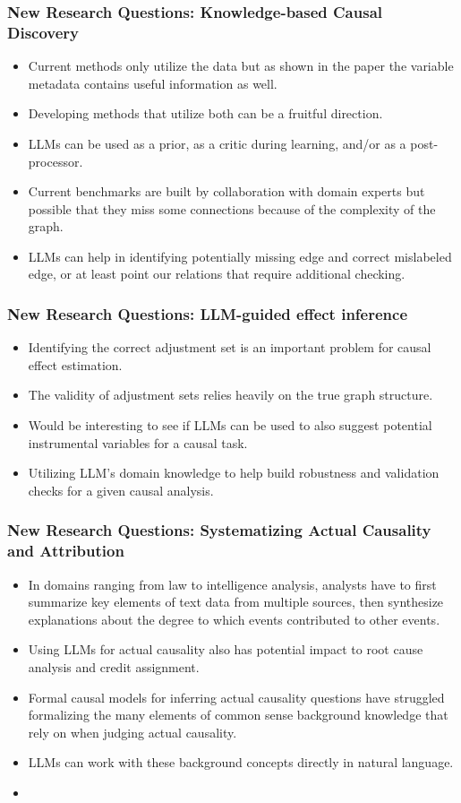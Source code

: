 \documentclass{beamer}
\begin{document}
\begin{frame}
	\frametitle{New Research Questions: Knowledge-based Causal Discovery}
	\begin{itemize}
		\item Current methods only utilize the data but as shown in the
			paper the variable metadata contains useful information
			as well.
		\item Developing methods that utilize both can be a fruitful direction.
		\item LLMs can be used as a prior, as a critic during learning, and/or
			as a post-processor.
		\item Current benchmarks are built by collaboration with domain 
			experts but possible that they miss some connections because
			of the complexity of the graph.
		\item LLMs can help in identifying potentially missing edge and 
			correct mislabeled edge, or at least point our relations
			that require additional checking.
	\end{itemize}
\end{frame}

\begin{frame}
	\frametitle{New Research Questions: LLM-guided effect inference}
	\begin{itemize}
		\item Identifying the correct adjustment set is an important problem
			for causal effect estimation.
		\item The validity of adjustment sets relies heavily on the true
			graph structure.
		\item Would be interesting to see if LLMs can be used to also
			suggest potential instrumental variables for a causal task.
		\item Utilizing LLM's domain knowledge to help build robustness
			and validation checks for a given causal analysis.
	\end{itemize}
\end{frame}

\begin{frame}
	\frametitle{New Research Questions: Systematizing Actual Causality and Attribution}
	\begin{itemize}
		\item In domains ranging from law to intelligence analysis, analysts 
			have to first summarize key elements of text data from 
			multiple sources, then synthesize explanations about the 
			degree to which events contributed to other events.
		\item Using LLMs for actual causality also has potential impact
			to root cause analysis and credit assignment.
		\item Formal causal models for inferring actual causality questions have
			struggled formalizing the many elements of common sense 
			background knowledge that rely on when judging actual causality.
		\item LLMs can work with these background concepts directly in natural
			language.
		\item {}
	\end{itemize}
\end{frame}
\end{document}
